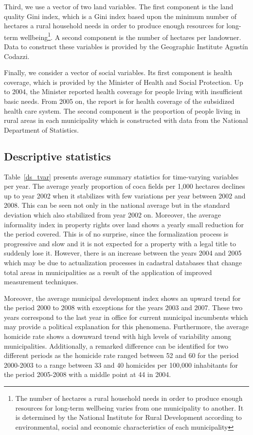 Third, we use a vector of two land variables. The first component is the land quality Gini index, which is a Gini index based upon the minimum number of hectares a rural household needs in order to produce enough resources for long-term wellbeing\footnote{The number of hectares a rural household needs in order to produce enough resources for long-term wellbeing varies from one municipality to another. It is determined by the National Institute for Rural Development according to environmental, social and economic characteristics of each municipality}. A second component is the number of hectares per landowner. Data to construct these variables is provided by the Geographic Institute Agust\'{i}n Codazzi.

Finally, we consider a vector of social variables. Its first component is health coverage, which is provided by the Minister of Health and Social Protection. Up to 2004, the Minister reported health coverage for people living with insufficient basic needs. From 2005 on, the report is for health coverage of the subsidized health care system. The second component is the proportion of people living in rural areas in each municipality which is constructed with data from the National Department of Statistics.

\subsection{Descriptive statistics}
\label{descriptive}

Table~\ref{ds_tvar} presents average summary statistics for time-varying variables per year. The average yearly proportion of coca fields per 1,000 hectares declines up to year 2002 when it stabilizes with few variations per year between 2002 and 2008. This can be seen not only in the national average but in the standard deviation which also stabilized from year 2002 on. Moreover, the average informality index in property rights over land shows a yearly small reduction for the period covered. This is of no surprise, since the formalization process is progressive and slow and it is not expected for a property with a legal title to suddenly lose it. However, there is an increase between the years 2004 and 2005 which may be due to actualization processes in cadastral databases that change total areas in municipalities as a result of the application of improved measurement techniques.

Moreover, the average municipal development index shows an upward trend for the period 2000 to 2008 with exceptions for the years 2003 and 2007. These two years correspond to the last year in office for current municipal incumbents which may provide a political explanation for this phenomena. Furthermore, the average homicide rate shows a downward trend with high levels of variability among municipalities. Additionally, a remarked difference can be identified for two different periods as the homicide rate ranged between 52 and 60 for the period 2000-2003 to a range between 33 and 40 homicides per 100,000 inhabitants for the period 2005-2008 with a middle point at 44 in 2004.

